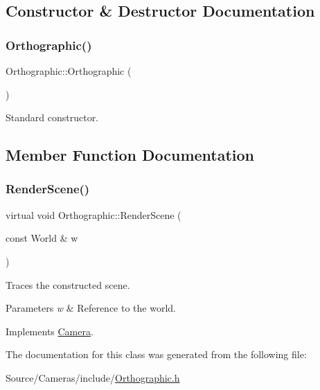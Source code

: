 \subsection{Constructor \& Destructor Documentation}
\hypertarget{class_orthographic_a3b6a0b737a8f9d8b3c1961241aef04dc}{}\label{class_orthographic_a3b6a0b737a8f9d8b3c1961241aef04dc} 
\subsubsection{\texorpdfstring{Orthographic()}{Orthographic()}}
{\footnotesize\ttfamily Orthographic\+::\+Orthographic (\begin{DoxyParamCaption}{ }\end{DoxyParamCaption})}

Standard constructor. 

\subsection{Member Function Documentation}
\hypertarget{class_orthographic_a0d7ee7bfe619febed73725b99d2cc0b0}{}\label{class_orthographic_a0d7ee7bfe619febed73725b99d2cc0b0} 
\subsubsection{\texorpdfstring{Render\+Scene()}{RenderScene()}}
{\footnotesize\ttfamily virtual void Orthographic\+::\+Render\+Scene (\begin{DoxyParamCaption}\item[{const World \&}]{w }\end{DoxyParamCaption})\hspace{0.3cm}{\ttfamily [virtual]}}

Traces the constructed scene. 
\begin{DoxyParams}{Parameters}
{\em w} & Reference to the world. \\
\hline
\end{DoxyParams}


Implements \hyperlink{class_camera_ad65367e9b225387219d013ffed3f621a}{Camera}.



The documentation for this class was generated from the following file\+:\begin{DoxyCompactItemize}
\item 
Source/\+Cameras/include/\hyperlink{_orthographic_8h}{Orthographic.\+h}\end{DoxyCompactItemize}
